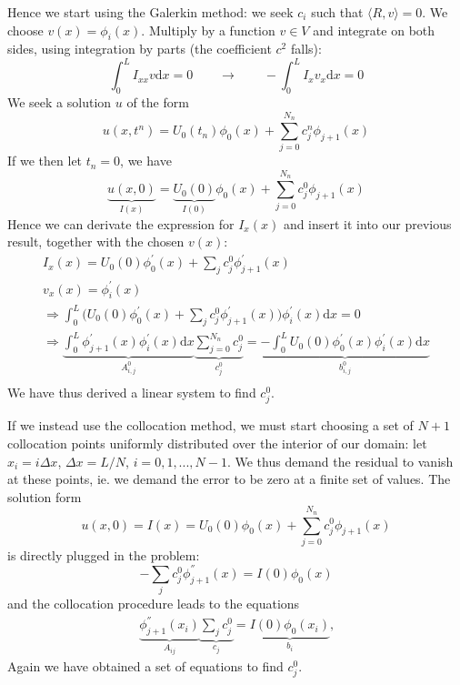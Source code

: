 \documentclass[a4paper,10pt]{article}
\begin{document}
\begin{description}
Hence we start using the Galerkin method: we seek ${c_i}$ such that $\langle R,v \rangle = 0$. We choose $v(x) = \phi_i (x)$. 
Multiply by a function $v \in V$ and integrate on both sides, using integration by parts (the coefficient $c^2$ falls):
\begin{equation*}
 \int_0^L I_{xx} v \mathrm{d}x = 0 \qquad \to \qquad
 - \int_0^L I_x v_x \mathrm{d}x = 0 
\end{equation*}
We seek a solution $u$ of the form
\[ u(x, t^n) = U_0 (t_n) \phi_0 (x) + \sum_{j=0}^{N_n} c_j^n \phi_{j+1} (x) \]
If we then let  $t_n = 0$, we have 
\[ \underbrace{u(x, 0)}_{I(x)} = \underbrace{ U_0 (0) }_{I(0)} \phi_0 (x) + \sum_{j=0}^{N_n} c_j^0 \phi_{j+1} (x) \]
Hence we can derivate the expression for $I_x(x)$ and insert it into our previous result, together with the chosen $v(x)$:
\begin{align*}
 I_x(x) = U_0 (0) \phi_0^{'} (x) + \sum_j c_j^0 \phi_{j+1}^{'} (x) \\ v_x(x) = \phi_i^{'} (x)\\ 
 \Rightarrow \int_0^L \Big( U_0 (0) \phi_0^{'} (x) + \sum_j c_j^0 \phi_{j+1}^{'} (x) \Big) \phi_i^{'} (x) \mathrm{d}x = 0 \\
 \Rightarrow \underbrace{ \int_0^L \phi_{j+1}^{'} (x) \phi_i^{'} (x) \mathrm{d}x }_{ A_{i,j}^0 } \underbrace{ \sum_{j=0}^{N_n} c_j^0 }_{c_j^0} 
 = \underbrace{ - \int_0^L U_0 (0) \phi_0^{'} (x) \phi_i^{'} (x) \mathrm{d}x}_{ b_{i,j}^0} \\
 \end{align*}
We have thus derived a linear system to find $c_j^0$.

If we instead use the collocation method, we must start choosing a set of $N+1$ collocation points uniformly distributed over 
the interior of our domain: let $x_i = i \Delta x$, $\Delta x = L/N$, $i = 0,1,...,N-1$. We thus demand the residual to vanish at these points, 
ie. we demand the error to be zero at a finite set of values. \newline
The solution form 
\[ u(x, 0) = I(x) = U_0 (0) \phi_0 (x) + \sum_{j=0}^{N_n} c_j^0 \phi_{j+1} (x)\]
is directly plugged in the problem:
\[ -\sum_j c_j^0 \phi_{j+1}^{''} (x) = I(0) \phi_0 (x) \]
and the collocation procedure leads to the equations
\begin{align*}
 \underbrace{\phi_{j+1}^{''}(x_i)}_{A_{ij}} \underbrace{\sum_j c_j^0}_{c_j} = \underbrace{I(0) \phi_0 (x_i)}_{b_i} \text{,}
\end{align*}
Again we have obtained a set of equations to find $c_j^0$. 


\end{description}
\end{document}
